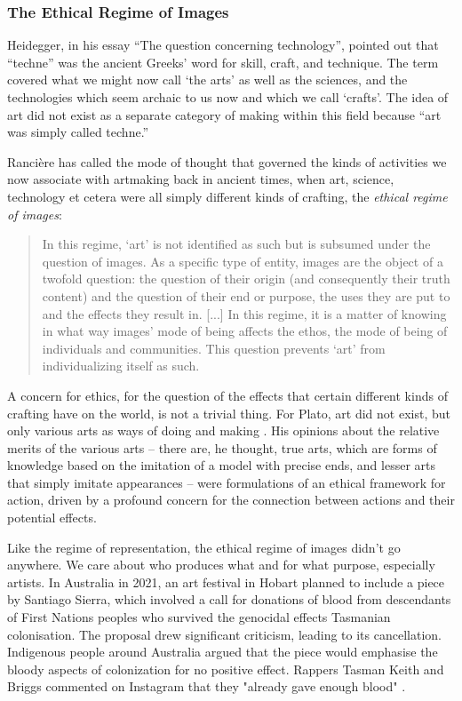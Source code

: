 \documentclass[letterpaper]{article}
\begin{document}
    \subsubsection{The Ethical Regime of Images}

    Heidegger, in his essay “The question concerning technology”, pointed out that “techne” was the ancient Greeks' word for skill, craft, and technique. The term covered what we might now call ‘the arts’ as well as the sciences, and the technologies which seem archaic to us now and which we call ‘crafts’. The idea of art did not exist as a separate category of making within this field because “art was simply called techne.” \citep[p34]{HeideggerThQstnCncrngTchnlgy1954}
    
    Rancière has called the mode of thought that governed the kinds of activities we now associate with artmaking back in ancient times, when art, science, technology et cetera were all simply different kinds of crafting, the \emph{ethical regime of images}:

    \begin{quote}
        In this regime, ‘art’ is not identified as such but is subsumed under the question of images. As a specific type of entity, images are the object of a twofold question: the question of their origin (and consequently their truth content) and the question of their end or purpose, the uses they are put to and the effects they result in. [...] In this regime, it is a matter of knowing in what way images' mode of being affects the ethos, the mode of being of individuals and communities. This question prevents ‘art’ from individualizing itself as such. \citep[pp.20–21]{RancierPltcsOfThAsthtcs2004}
    \end{quote}

    A concern for ethics, for the question of the effects that certain different kinds of crafting have on the world, is not a trivial thing. For Plato, art did not exist, but only various arts as ways of doing and making \citep[p.20]{RancierPltcsOfThAsthtcs2004}. His opinions about the relative merits of the various arts – there are, he thought, true arts, which are forms of knowledge based on the imitation of a model with precise ends, and lesser arts that simply imitate appearances \citep[p.20]{RancierPltcsOfThAsthtcs2004} – were formulations of an ethical framework for action, driven by a profound concern for the connection between actions and their potential effects.

    Like the regime of representation, the ethical regime of images didn't go anywhere. We care about who produces what and for what purpose, especially artists. In Australia in 2021, an art festival in Hobart planned to include a piece by Santiago Sierra, which involved a call for donations of blood from descendants of First Nations peoples who survived the genocidal effects Tasmanian colonisation. The proposal drew significant criticism, leading to its cancellation. Indigenous people around Australia argued that the piece would emphasise the bloody aspects of colonization for no positive effect. Rappers Tasman Keith and Briggs commented on Instagram that they "already gave enough blood" \citep{DrkMfBld2021}.
\end{document}
